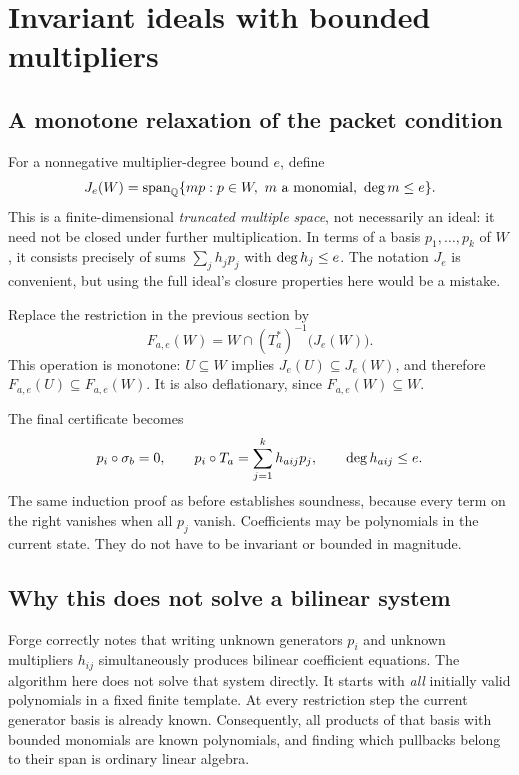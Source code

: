 \section{Invariant ideals with bounded multipliers}
\label{sec:ideals}

\subsection{A monotone relaxation of the packet condition}
For a nonnegative multiplier-degree bound $e$, define
\begin{equation}
\label{eq:bounded-ideal}
 J_e(W)=\operatorname{span}_{\mathbb{Q}}\{m p : p\in W,\ m\text{ a monomial},\ \operatorname{deg} m\le e\}.
\end{equation}
This is a finite-dimensional \emph{truncated multiple space}, not necessarily
an ideal: it need not be closed under further multiplication. In terms of a
basis $p_1,\ldots,p_k$ of $W$, it consists precisely of sums
$\sum_j h_jp_j$ with $\operatorname{deg} h_j\le e$. The notation $J_e$ is convenient, but
using the full ideal's closure properties here would be a mistake.

Replace the restriction in the previous section by
\begin{equation}
\label{eq:ideal-restriction}
 F_{a,e}(W)=W\cap(T_a^*)^{-1}\bigl(J_e(W)\bigr).
\end{equation}
This operation is monotone: $U\subseteq W$ implies
$J_e(U)\subseteq J_e(W)$, and therefore $F_{a,e}(U)\subseteq F_{a,e}(W)$.
It is also deflationary, since $F_{a,e}(W)\subseteq W$.

The final certificate becomes
\begin{equation}
\label{eq:poly-packet}
 p_i\circ\sigma_b=0,
 \qquad p_i\circ T_a=\sum_{j=1}^k h_{aij}p_j,
 \qquad \operatorname{deg} h_{aij}\le e.
\end{equation}
The same induction proof as before establishes soundness, because every term
on the right vanishes when all $p_j$ vanish. Coefficients may be polynomials in
the current state. They do not have to be invariant or bounded in magnitude.

\subsection{Why this does not solve a bilinear system}
Forge correctly notes that writing unknown generators $p_i$ and unknown
multipliers $h_{ij}$ simultaneously produces bilinear coefficient equations.
The algorithm here does not solve that system directly. It starts with
\emph{all} initially valid polynomials in a fixed finite template. At every
restriction step the current generator basis is already known. Consequently,
all products of that basis with bounded monomials are known polynomials, and
finding which pullbacks belong to their span is ordinary linear algebra.

